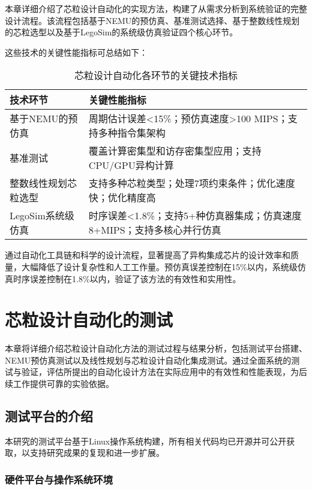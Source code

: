 \documentclass[bachelor]{thesis-uestc}
\begin{document}
本章详细介绍了芯粒设计自动化的实现方法，构建了从需求分析到系统验证的完整设计流程。该流程包括基于NEMU的预仿真、基准测试选择、基于整数线性规划的芯粒选型以及基于LegoSim的系统级仿真验证四个核心环节。

这些技术的关键性能指标可总结如下：

\begin{table}[htbp]
\caption{芯粒设计自动化各环节的关键技术指标}
\centering
\begin{tabular}{|l|p{10cm}|}
\hline
\textbf{技术环节} & \textbf{关键性能指标} \\
\hline
基于NEMU的预仿真 & 周期估计误差<15\%；预仿真速度>100 MIPS；支持多种指令集架构 \\
\hline
基准测试 & 覆盖计算密集型和访存密集型应用；支持CPU/GPU异构计算 \\
\hline
整数线性规划芯粒选型 & 支持多种芯粒类型；处理7项约束条件；优化速度快；优化精度高\\
\hline
LegoSim系统级仿真 & 时序误差<1.8\%；支持5+种仿真器集成；仿真速度8+MIPS；支持多核心并行仿真 \\
\hline
\end{tabular}
\label{tab:key_metrics}
\end{table}

通过自动化工具链和科学的设计流程，显著提高了异构集成芯片的设计效率和质量，大幅降低了设计复杂性和人工工作量。预仿真误差控制在15\%以内，系统级仿真时序误差控制在1.8\%以内，验证了该方法的有效性和实用性。



\chapter{芯粒设计自动化的测试}

本章将详细介绍芯粒设计自动化方法的测试过程与结果分析，包括测试平台搭建、NEMU预仿真测试以及线性规划与芯粒设计自动化集成测试。通过全面系统的测试与验证，评估所提出的自动化设计方法在实际应用中的有效性和性能表现，为后续工作提供可靠的实验依据。

\section{测试平台的介绍}

本研究的测试平台基于Linux操作系统构建，所有相关代码均已开源并可公开获取，以支持研究成果的复现和进一步扩展。

\subsection{硬件平台与操作系统环境}
\end{document}
